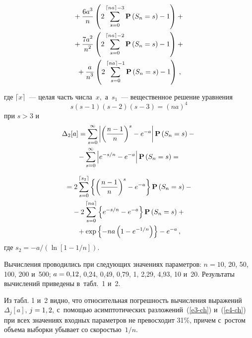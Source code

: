 \begin{multicols}{2}
 
\noindent  
\begin{multline}
  {}+\displaystyle\frac{\displaystyle 6a^3\mathstrut}{\displaystyle n\mathstrut}\left(2\sum\limits_{s=0}^{\lceil na \rceil-3} 
  \mathbf{P}\left(S_n=s\right)-1 \right)+{}
 \\ 
 {}+\displaystyle\frac{\displaystyle 7a^2\mathstrut}{\displaystyle n^2\mathstrut}\left(2\sum\limits_{s=0}^{\lceil na \rceil-2} 
 \mathbf{P}\left(S_n=s\right)-1 \right)
 +{}\\
 {}+\displaystyle\frac{\displaystyle a\mathstrut}{\displaystyle n^3\mathstrut}\left(2\sum\limits_{s=0}^{\lceil na \rceil-1} 
 \mathbf{P}\left(S_n=s\right)-1 \right)\,,
 \label{e55-ch}
 \end{multline}
 
 
 \noindent
 где $\lceil x \rceil$~--- целая часть числа~$x,$ а~$s_1$~--- 
 вещественное решение уравнения 
 \begin{equation*}
 s(s-1)(s-2)(s-3)=(na)^4
 \end{equation*}
 при $s>3$  и
 \begin{multline*}
 \Delta_2[a]=
  \sum\limits_{s=0}^\infty \left|\left(\displaystyle\frac{\displaystyle n-1\mathstrut}{\displaystyle n\mathstrut}\right)^s-e^{-a} \right|
 \mathbf{P}\left(S_n=s\right)
  -{}\\
  {}-\sum\limits_{s=0}^\infty \left|e^{-s/n}-e^{-a} \right|
 \mathbf{P}\left(S_n=s\right)={}
 \end{multline*}
 
\noindent
  \begin{multline}
{} =2\sum\limits_{s=0}^{\lceil s_2 \rceil}
 \left\{\left(\displaystyle\frac{\displaystyle n-1\mathstrut}{\displaystyle n\mathstrut}\right)^s-e^{-a} \right\}\mathbf{P}\left(S_n=s\right)
 -{}\\
 {}- 2\sum\limits_{s=0}^{\lceil n a \rceil}
 \left\{e^{-s/n}-e^{-a} \right\}\mathbf{P}\left(S_n=s\right)+{}
 \\ 
{} +\exp\left\{-n a \left(1-e^{-1/n}\right) \right\}-e^{-a}\,,
 \label{e56-ch}
 \end{multline}
где $s_2=-{a}/({\ln[1-1/n]})$.


 Вычисления проводились при следующих значениях параметров:
  $n=10$, 20, 50, 100, 200 и~500;  $a\hm=0{,}12$, 0{,}24, 0{,}49, 0{,}79,
 1, 2{,}29, 4{,}93, 10 и~20. Результаты вычислений приведены в~табл.~1 и~2.
 {
 
 }



 Из табл. 1 и~2 видно, что относительная погрешность
 вычисления выражений $\Delta_j[a]$, $j\hm=1,2,$ с~по\-мощью асимптотических 
 разложений~(\ref{e3-ch}) и~(\ref{e4-ch}) 
 при всех значениях входных параметров не превосходит 31\%,
 причем с~ростом объема выборки убывает со скоростью~$1/n$.


\end{multicols}
